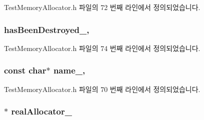 Test\+Memory\+Allocator.\+h 파일의 72 번째 라인에서 정의되었습니다.

\subsubsection[{\texorpdfstring{has\+Been\+Destroyed\+\_\+}{hasBeenDestroyed_}}]{ has\+Been\+Destroyed\+\_\+\hspace{0.3cm}{\ttfamily [protected]}, {\ttfamily [inherited]}}\hypertarget{class_test_memory_allocator_a971604f223534e64d5024d63396b397a}{}\label{class_test_memory_allocator_a971604f223534e64d5024d63396b397a}


Test\+Memory\+Allocator.\+h 파일의 74 번째 라인에서 정의되었습니다.

\subsubsection[{\texorpdfstring{name\+\_\+}{name_}}]{\setlength{\rightskip}{0pt plus 5cm}const char$\ast$ name\+\_\+\hspace{0.3cm}{\ttfamily [protected]}, {\ttfamily [inherited]}}\hypertarget{class_test_memory_allocator_a7dac8366c11fbcad2f49d85fe8fc4fbe}{}\label{class_test_memory_allocator_a7dac8366c11fbcad2f49d85fe8fc4fbe}


Test\+Memory\+Allocator.\+h 파일의 70 번째 라인에서 정의되었습니다.

\subsubsection[{\texorpdfstring{real\+Allocator\+\_\+}{realAllocator_}}]{$\ast$ real\+Allocator\+\_\+\hspace{0.3cm}{\ttfamily [protected]}}\hypertarget{class_memory_report_allocator_ab9c67fc1ce22037b740577262578c47f}{}\label{class_memory_report_allocator_ab9c67fc1ce22037b740577262578c47f}


